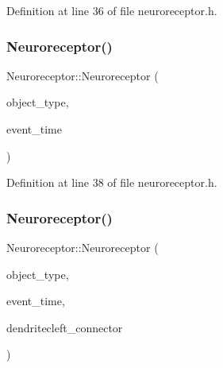 Definition at line 36 of file neuroreceptor.\+h.

\mbox{\label{class_neuroreceptor_a600273e92c3a4b076273d41fa58b58e9}} 
\subsubsection{\texorpdfstring{Neuroreceptor()}{Neuroreceptor()}\hspace{0.1cm}{\footnotesize\ttfamily [3/4]}}
{\footnotesize\ttfamily Neuroreceptor\+::\+Neuroreceptor (\begin{DoxyParamCaption}\item[{unsigned int}]{object\+\_\+type,  }\item[{std\+::chrono\+::time\+\_\+point$<$ \hyperlink{universe_8h_a0ef8d951d1ca5ab3cfaf7ab4c7a6fd80}{Clock} $>$}]{event\+\_\+time }\end{DoxyParamCaption})\hspace{0.3cm}{\ttfamily [inline]}}



Definition at line 38 of file neuroreceptor.\+h.

\mbox{\label{class_neuroreceptor_ab002bab3b4ffeed402f60e574ce0263e}} 
\subsubsection{\texorpdfstring{Neuroreceptor()}{Neuroreceptor()}\hspace{0.1cm}{\footnotesize\ttfamily [4/4]}}
{\footnotesize\ttfamily Neuroreceptor\+::\+Neuroreceptor (\begin{DoxyParamCaption}\item[{unsigned int}]{object\+\_\+type,  }\item[{std\+::chrono\+::time\+\_\+point$<$ \hyperlink{universe_8h_a0ef8d951d1ca5ab3cfaf7ab4c7a6fd80}{Clock} $>$}]{event\+\_\+time,  }\item[{\hyperlink{class_dendrite_cleft}{Dendrite\+Cleft} \&}]{dendritecleft\+\_\+connector }\end{DoxyParamCaption})\hspace{0.3cm}{\ttfamily [inline]}}



